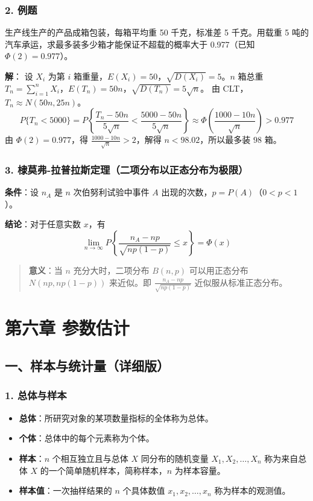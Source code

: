 \documentclass[12pt,a4paper]{ctexart}
\newenvironment{myquote}
  {\par\vspace{0.5em}\begin{quote}\sffamily\color{gray}}
  {\end{quote}\vspace{0.5em}}
\begin{document}
\subsubsection{2. 例题}
生产线生产的产品成箱包装，每箱平均重 50 千克，标准差 5 千克。用载重 5 吨的汽车承运，求最多装多少箱才能保证不超载的概率大于 0.977（已知 $\Phi(2) = 0.977$）。

\textbf{解}：
设 $X_i$ 为第 $i$ 箱重量，$E(X_i)=50$，$\sqrt{D(X_i)}=5$。$n$ 箱总重 $T_n = \sum_{i=1}^n X_i$，$E(T_n)=50n$，$\sqrt{D(T_n)}=5\sqrt{n}$。
由 CLT，$T_n \approx N(50n, 25n)$。
\[
    P\{T_n < 5000\} = P\left\{\frac{T_n - 50n}{5\sqrt{n}} < \frac{5000 - 50n}{5\sqrt{n}}\right\} \approx \Phi\left(\frac{1000 - 10n}{\sqrt{n}}\right) > 0.977
\]
由 $\Phi(2)=0.977$，得 $\frac{1000 - 10n}{\sqrt{n}} > 2$，解得 $n < 98.02$，所以最多装 $\boxed{98}$ 箱。

\subsubsection{3. 棣莫弗-拉普拉斯定理（二项分布以正态分布为极限）}
\textbf{条件}：设 $n_A$ 是 $n$ 次伯努利试验中事件 $A$ 出现的次数，$p = P(A)$（$0 < p < 1$）。

\textbf{结论}：对于任意实数 $x$，有
\[
    \lim_{n \to \infty} P\left\{\frac{n_A - np}{\sqrt{np(1-p)}} \le x\right\} = \Phi(x)
\]

\begin{myquote}
    \textbf{意义}：当 $n$ 充分大时，二项分布 $B(n, p)$ 可以用正态分布 $N(np, np(1-p))$ 来近似。即 $\frac{n_A - np}{\sqrt{np(1-p)}}$ 近似服从标准正态分布。
\end{myquote}

\newpage
\section{第六章 参数估计}

\subsection{一、样本与统计量（详细版）}

\subsubsection{1. 总体与样本}
\begin{itemize}[noitemsep]
    \item \textbf{总体}：所研究对象的某项数量指标的全体称为总体。
    \item \textbf{个体}：总体中的每个元素称为个体。
    \item \textbf{样本}：$n$ 个相互独立且与总体 $X$ 同分布的随机变量 $X_1, X_2, \dots, X_n$ 称为来自总体 $X$ 的一个简单随机样本，简称样本，$n$ 为样本容量。
    \item \textbf{样本值}：一次抽样结果的 $n$ 个具体数值 $x_1, x_2, \dots, x_n$ 称为样本的观测值。
\end{itemize}
\end{document}
